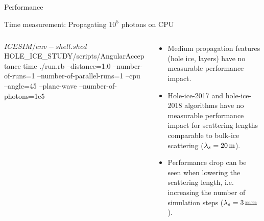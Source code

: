 
\begin{frame}[fragile]{Performance}

  Time measurement: Propagating $10^5$ photons on CPU

  \begin{columns}
    \begin{column}{0.6\textwidth}

      \begin{smallbash}
        $ICESIM/env-shell.sh
        cd $HOLE_ICE_STUDY/scripts/AngularAcceptance
        time ./run.rb --distance=1.0 --number-of-runs=1 --number-of-parallel-runs=1 --cpu --angle=45 --plane-wave --number-of-photons=1e5
      \end{smallbash}

    \end{column}
    \begin{column}{0.4\textwidth}
      \begin{itemize}
        \item Medium propagation features (hole ice, layers) have no measurable performance impact.
        \item Hole-ice-2017 and hole-ice-2018 algorithms have no measurable performance impact for scattering lengths comparable to bulk-ice scattering ($\lambda_s = 20\text{\,m}$).
        \item Performance drop can be seen when lowering the scattering length, i.e. increasing the number of simulation steps ($\lambda_s = 3\text{\,mm}$).
      \end{itemize}
    \end{column}
  \end{columns}


\end{frame}